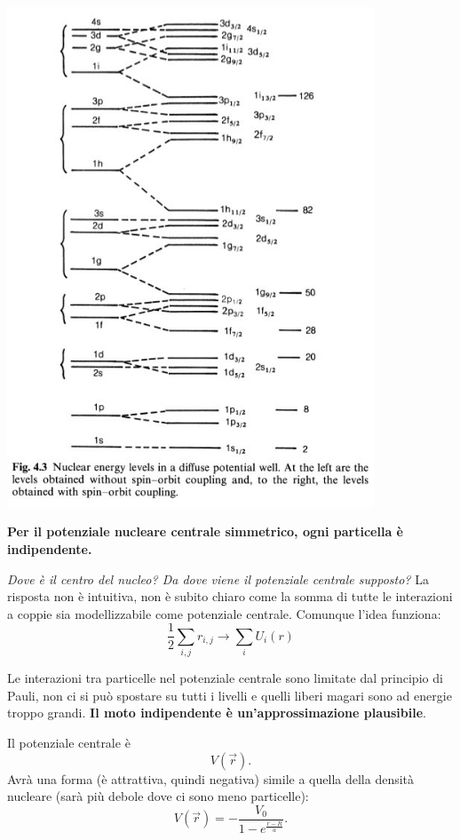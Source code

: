 \documentclass[a4paper,11pt,twoside,openany]{book}
\theoremstyle{definition}
\theoremstyle{plain}
\theoremstyle{plain}
\theoremstyle{definition}
\begin{document}
\begin{center}
\includegraphics[width=4.3in]{immagini/shell.jpg} %
\end{center}

\textbf{Per il potenziale nucleare centrale simmetrico, ogni particella è indipendente.}

\emph{Dove è il centro del nucleo? Da dove viene il potenziale centrale supposto?} La risposta non è intuitiva, non è subito chiaro come la somma di tutte le interazioni a coppie sia modellizzabile come potenziale centrale. Comunque l'idea funziona:
\begin{equation}
\frac{1}{2}\sum_{i,j}r_{i,j} \longrightarrow \sum_i{U_i(r)}
\end{equation}

Le interazioni tra particelle nel potenziale centrale sono limitate dal principio di Pauli, non ci si può spostare su tutti i livelli e quelli liberi magari sono ad energie troppo grandi. \textbf{Il moto indipendente è un'approssimazione plausibile}.

Il potenziale centrale è $$V(\vec r).$$ Avrà una forma (è attrattiva, quindi negativa) simile a quella della densità nucleare (sarà più debole dove ci sono meno particelle):
\begin{equation}
V(\vec r)=-\frac{V_0}{1-e^{\frac{r-R}{a}}}.
\end{equation}
\end{document}
